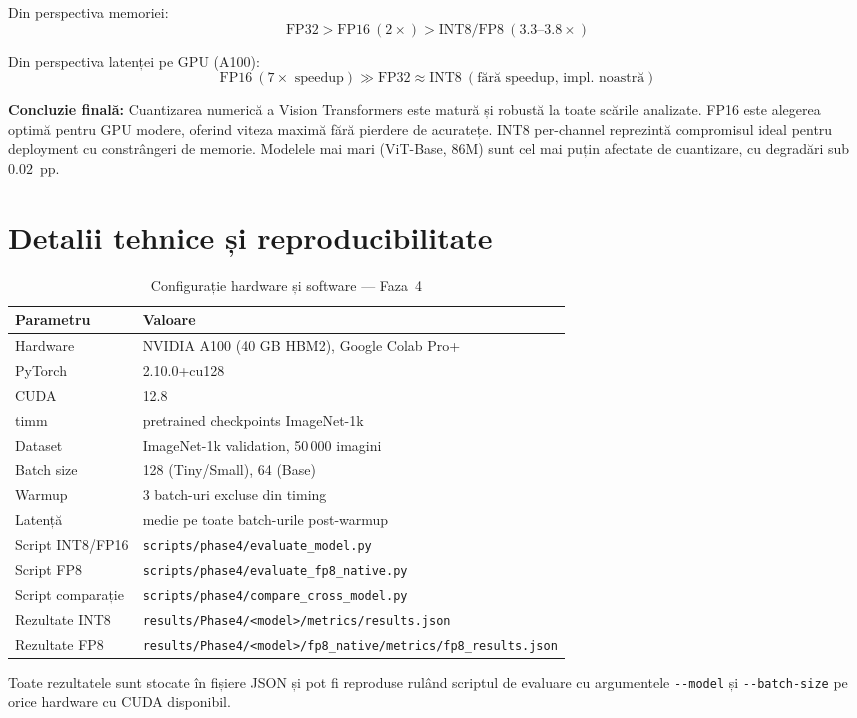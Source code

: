 \documentclass[12pt,a4paper]{article}
\begin{document}
Din perspectiva memoriei:
\[
  \text{FP32} > \text{FP16}\ (2\times) > \text{INT8/FP8}\ (3.3\text{--}3.8\times)
\]

Din perspectiva latenței pe GPU (A100):
\[
  \text{FP16}\ (7\times \text{ speedup}) \gg
  \text{FP32} \approx \text{INT8}\ (\text{fără speedup, impl. noastră})
\]

\textbf{Concluzie finală:} Cuantizarea numerică a Vision Transformers este
matură și robustă la toate scările analizate. FP16 este alegerea optimă
pentru GPU modere, oferind viteza maximă fără pierdere de acuratețe.
INT8 per-channel reprezintă compromisul ideal pentru deployment cu
constrângeri de memorie. Modelele mai mari (ViT-Base, 86M) sunt cel mai
puțin afectate de cuantizare, cu degradări sub $0.02$~pp.

\section{Detalii tehnice și reproducibilitate}

\begin{table}[H]
  \centering
  \caption{Configurație hardware și software --- Faza~4}
  \small
  \begin{tabular}{lp{9.5cm}}
    \toprule
    \textbf{Parametru} & \textbf{Valoare} \\
    \midrule
    Hardware & NVIDIA A100 (40 GB HBM2), Google Colab Pro+ \\
    PyTorch & 2.10.0+cu128 \\
    CUDA & 12.8 \\
    timm & pretrained checkpoints ImageNet-1k \\
    Dataset & ImageNet-1k validation, 50\,000 imagini \\
    Batch size & 128 (Tiny/Small), 64 (Base) \\
    Warmup & 3 batch-uri excluse din timing \\
    Latență & medie pe toate batch-urile post-warmup \\
    \midrule
    Script INT8/FP16 & \texttt{scripts/phase4/evaluate\_model.py} \\
    Script FP8 & \texttt{scripts/phase4/evaluate\_fp8\_native.py} \\
    Script comparație & \texttt{scripts/phase4/compare\_cross\_model.py} \\
    Rezultate INT8 & \texttt{results/Phase4/<model>/metrics/results.json} \\
    Rezultate FP8 & \texttt{results/Phase4/<model>/fp8\_native/metrics/fp8\_results.json} \\
    \bottomrule
  \end{tabular}
  \label{tab:config}
\end{table}

Toate rezultatele sunt stocate în fișiere JSON și pot fi reproduse rulând
scriptul de evaluare cu argumentele \texttt{-{}-model} și
\texttt{-{}-batch-size} pe orice hardware cu CUDA disponibil.

\end{document}
